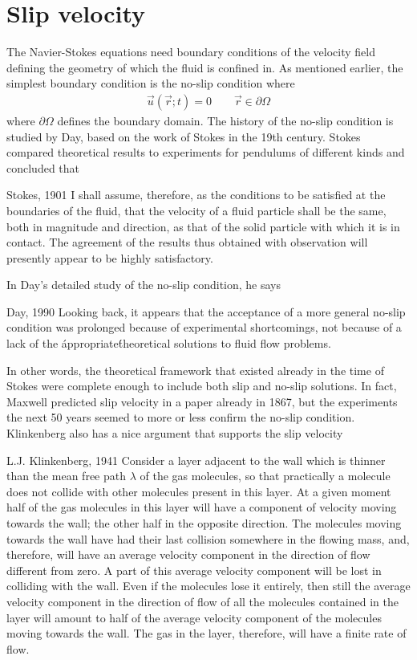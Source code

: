 \section{Slip velocity}
\label{sec:slip_length}
The Navier-Stokes equations need boundary conditions of the velocity field defining the geometry of which the fluid is confined in. As mentioned earlier, the simplest boundary condition is the no-slip condition where
\begin{align}
	\vec u(\vec r; t) = 0 \qquad \vec r \in \partial\Omega
\end{align}
where $\partial\Omega$ defines the boundary domain. The history of the no-slip condition is studied by Day, based on the work of Stokes in the 19th century. Stokes compared theoretical results to experiments for pendulums of different kinds and concluded that\cite{day1990no}
\begin{aquote}{Stokes, 1901}
	I shall assume, therefore, as the conditions to be satisfied at the boundaries of the fluid, that the velocity of a fluid particle shall be the same, both in magnitude and direction, as that of the solid particle with which it is in contact. The agreement of the results thus obtained with observation will presently appear to be highly satisfactory.
\end{aquote}
In Day's detailed study of the no-slip condition, he says
\begin{aquote}{Day, 1990}
	Looking back, it appears that the acceptance of a more general no-slip condition was prolonged because of experimental shortcomings, not because of a lack of the \'appropriate\' theoretical solutions to fluid flow problems.
\end{aquote}
In other words, the theoretical framework that existed already in the time of Stokes were complete enough to include both slip and no-slip solutions. In fact, Maxwell predicted slip velocity in a paper already in 1867\cite{maxwell1879stresses}, but the experiments the next 50 years seemed to more or less confirm the no-slip condition.  Klinkenberg also has a nice argument that supports the slip velocity
\begin{aquote}{L.J. Klinkenberg, 1941}
Consider a layer adjacent to the wall which is thinner than the mean free path $\lambda$ of the gas molecules, so that practically a molecule does not collide with other molecules present in this layer. At a given moment half of the gas molecules in this layer will have a component of velocity moving towards the wall; the other half in the opposite direction. The molecules moving towards the wall have had their last collision somewhere in the flowing mass, and, therefore, will have an average velocity component in the direction of flow different from zero. A part of this average velocity component will be lost in colliding with the wall. Even if the molecules lose it entirely, then still the average velocity component in the direction of flow of all the molecules contained in the layer will amount to half of the average velocity component of the molecules moving towards the wall. The gas in the layer, therefore, will have a finite rate of flow.
\end{aquote}
